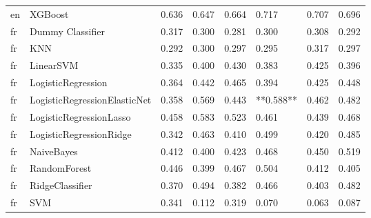 \begin{tabular}{llllllll}
      en &                      XGBoost & 0.636 &                     0.647 &                 0.664 &                  0.717 &                                   0.707 &     0.696 \\
      fr &             Dummy Classifier & 0.317 &                     0.300 &                 0.281 &                  0.300 &                                   0.308 &     0.292 \\
      fr &                          KNN & 0.292 &                     0.300 &                 0.297 &                  0.295 &                                   0.317 &     0.297 \\
      fr &                    LinearSVM & 0.335 &                     0.400 &                 0.430 &                  0.383 &                                   0.425 &     0.396 \\
      fr &           LogisticRegression & 0.364 &                     0.442 &                 0.465 &                  0.394 &                                   0.425 &     0.448 \\
      fr & LogisticRegressionElasticNet & 0.358 &                     0.569 &                 0.443 &              **0.588** &                                   0.462 &     0.482 \\
      fr &      LogisticRegressionLasso & 0.458 &                     0.583 &                 0.523 &                  0.461 &                                   0.439 &     0.468 \\
      fr &      LogisticRegressionRidge & 0.342 &                     0.463 &                 0.410 &                  0.499 &                                   0.420 &     0.485 \\
      fr &                   NaiveBayes & 0.412 &                     0.400 &                 0.423 &                  0.468 &                                   0.450 &     0.519 \\
      fr &                 RandomForest & 0.446 &                     0.399 &                 0.467 &                  0.504 &                                   0.412 &     0.405 \\
      fr &              RidgeClassifier & 0.370 &                     0.494 &                 0.382 &                  0.466 &                                   0.403 &     0.482 \\
      fr &                          SVM & 0.341 &                     0.112 &                 0.319 &                  0.070 &                                   0.063 &     0.087 \\

\end{tabular}
